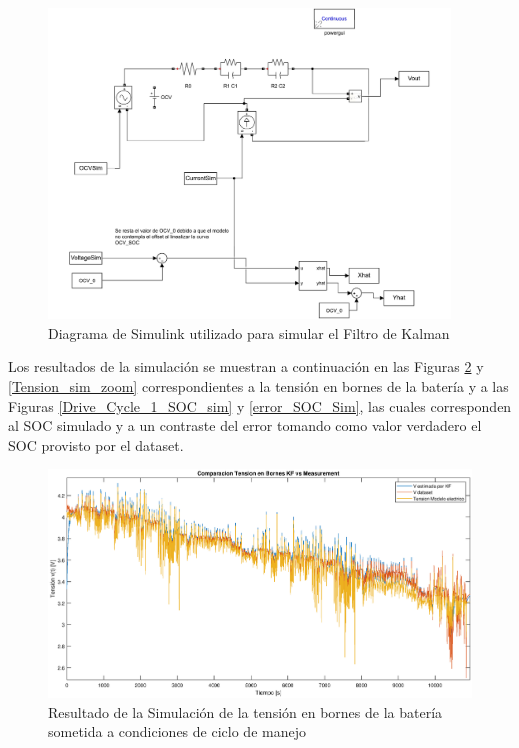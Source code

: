 \documentclass[10pt,a4paper]{article}
\begin{document}
\begin{figure}[h!]
    \begin{center}
	\includegraphics[width=0.95\textwidth]{simulink.pdf}
	\caption{Diagrama de Simulink utilizado para simular el Filtro de Kalman}
	\label{simulink_diagram}
    \end{center}
\end{figure}

Los resultados de la simulación se muestran a continuación en las Figuras
\ref{Tension_sim} y \ref{Tension_sim_zoom} correspondientes a la tensión en
bornes de la batería y  a las Figuras \ref{Drive_Cycle_1_SOC_sim} y
\ref{error_SOC_Sim}, las cuales corresponden al SOC simulado y a un contraste
del error tomando como valor verdadero el SOC provisto por el dataset.

\begin{figure}[h!]
    \begin{center}
	\includegraphics[width=1\textwidth]{Tension_Sim.eps}
	\caption{Resultado de la Simulación de la tensión en bornes de la 
	batería sometida a condiciones de ciclo de manejo}
	\label{Tension_sim}
    \end{center}
\end{figure}
\end{document}
